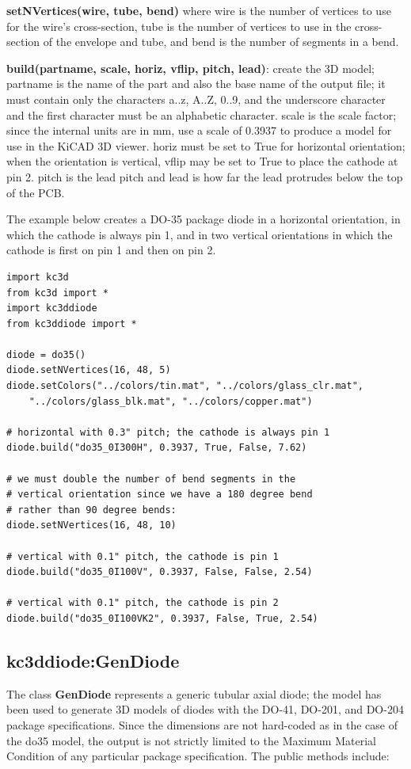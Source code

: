\textbf{setNVertices(wire, tube, bend)} where wire is the number of
vertices to use for the wire's cross-section, tube is the number of
vertices to use in the cross-section of the envelope and tube,
and bend is the number of segments in a bend.

\textbf{build(partname, scale, horiz, vflip, pitch, lead)}: create the
3D model; partname is the name of the part and also the base name of the
output file; it must contain only the characters a..z, A..Z, 0..9, and the 
underscore character and the first character must be an alphabetic character.
scale is the scale factor; since the internal units are in mm, use a scale of
0.3937 to produce a model for use in the KiCAD 3D viewer. horiz must be set to
True for horizontal orientation; when the orientation is vertical, vflip may
be set to True to place the cathode at pin 2. pitch is the lead pitch and
lead is how far the lead protrudes below the top of the PCB.

The example below creates a DO-35 package diode in a horizontal orientation,
in which the cathode is always pin 1, and in two vertical orientations in which
the cathode is first on pin 1 and then on pin 2.

\begin{verbatim}
import kc3d
from kc3d import *
import kc3ddiode
from kc3ddiode import *

diode = do35()
diode.setNVertices(16, 48, 5)
diode.setColors("../colors/tin.mat", "../colors/glass_clr.mat",
    "../colors/glass_blk.mat", "../colors/copper.mat")

# horizontal with 0.3" pitch; the cathode is always pin 1
diode.build("do35_0I300H", 0.3937, True, False, 7.62)

# we must double the number of bend segments in the
# vertical orientation since we have a 180 degree bend
# rather than 90 degree bends:
diode.setNVertices(16, 48, 10)

# vertical with 0.1" pitch, the cathode is pin 1
diode.build("do35_0I100V", 0.3937, False, False, 2.54)

# vertical with 0.1" pitch, the cathode is pin 2
diode.build("do35_0I100VK2", 0.3937, False, True, 2.54)
\end{verbatim}


\subsection{kc3ddiode:GenDiode}
The class \textbf{GenDiode} represents a generic tubular axial diode;
the model has been used to generate 3D models of diodes with the
DO-41, DO-201, and DO-204 package specifications. Since the dimensions
are not hard-coded as in the case of the do35 model, the output is
not strictly limited to the Maximum Material Condition of any particular
package specification. The public methods
include:


